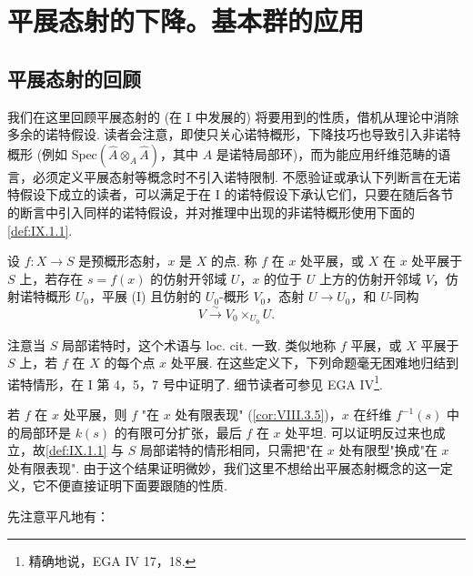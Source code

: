 \chapter{平展态射的下降。基本群的应用}

\section{平展态射的回顾}

我们在这里回顾平展态射的 (在 I 中发展的) 将要用到的性质，借机从理论中消除多余的诺特假设. 读者会注意，即使只关心诺特概形，下降技巧也导致引入非诺特概形 (例如 $\mathrm{Spec}(\widehat{A} \otimes_A \widehat{A})$，其中 $A$ 是诺特局部环)，而为能应用纤维范畴的语言，必须定义平展态射等概念时不引入诺特限制. 不愿验证或承认下列断言在无诺特假设下成立的读者，可以满足于在 I 的诺特假设下承认它们，只要在随后各节的断言中引入同样的诺特假设，并对推理中出现的非诺特概形使用下面的\cref{def:IX.1.1}.

\begin{definition}\label{def:IX.1.1}
设 $f \colon X \to S$ 是预概形态射，$x$ 是 $X$ 的点. 称 $f$ 在 $x$ 处平展，或 $X$ 在 $x$ 处平展于 $S$ 上，若存在 $s = f(x)$ 的仿射开邻域 $U$，$x$ 的位于 $U$ 上方的仿射开邻域 $V$，仿射诺特概形 $U_0$，平展 (I) 且仿射的 $U_0$-概形 $V_0$，态射 $U \to U_0$，和 $U$-同构
\[
V \xrightarrow{\sim} V_0 \times_{U_0} U.
\]
\end{definition}

注意当 $S$ 局部诺特时，这个术语与 loc. cit. 一致. 类似地称 $f$ 平展，或 $X$ 平展于 $S$ 上，若 $f$ 在 $X$ 的每个点 $x$ 处平展. 在这些定义下，下列命题毫无困难地归结到诺特情形，在 I 第 4，5，7 号中证明了. 细节读者可参见 EGA IV\footnote{精确地说，EGA IV 17，18.}.

\begin{remark}\label{rem:IX.1.2}
若 $f$ 在 $x$ 处平展，则 $f$ "在 $x$ 处有限表现" (\cref{cor:VIII.3.5})，$x$ 在纤维 $f^{-1}(s)$ 中的局部环是 $k(s)$ 的有限可分扩张，最后 $f$ 在 $x$ 处平坦. 可以证明反过来也成立，故\cref{def:IX.1.1} 与 $S$ 局部诺特的情形相同，只需把"在 $x$ 处有限型"换成"在 $x$ 处有限表现". 由于这个结果证明微妙，我们这里不想给出平展态射概念的这一定义，它不便直接证明下面要跟随的性质.
\end{remark}

先注意平凡地有：

